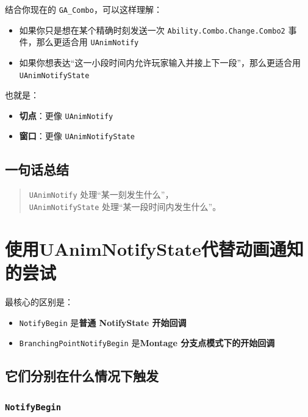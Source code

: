 结合你现在的 \verb|GA_Combo|，可以这样理解：

\begin{itemize}
	\item 如果你只是想在某个精确时刻发送一次 \verb|Ability.Combo.Change.Combo2| 事件，那么更适合用 \verb|UAnimNotify|
	\item 如果你想表达“这一小段时间内允许玩家输入并接上下一段”，那么更适合用 \verb|UAnimNotifyState|
\end{itemize}

也就是：

\begin{itemize}
	\item \textbf{切点}：更像 \verb|UAnimNotify|
	\item \textbf{窗口}：更像 \verb|UAnimNotifyState|
\end{itemize}

\subsection{一句话总结}

\begin{quote}
	\verb|UAnimNotify| 处理“某一刻发生什么”，\\
	\verb|UAnimNotifyState| 处理“某一段时间内发生什么”。
\end{quote}	

\section{使用UAnimNotifyState代替动画通知的尝试}

最核心的区别是：

\begin{itemize}
	\item \verb|NotifyBegin| 是\textbf{普通 NotifyState 开始回调}
	\item \verb|BranchingPointNotifyBegin| 是\textbf{Montage 分支点模式下的开始回调}
\end{itemize}

\subsection{它们分别在什么情况下触发}

\subsubsection{\texttt{NotifyBegin}}

